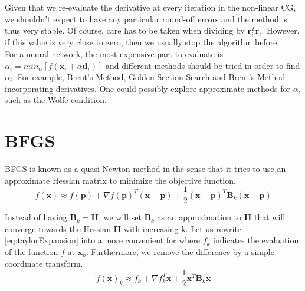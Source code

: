 \documentclass[a4paper,10pt]{article}
\theoremstyle{definition}
\begin{document}
Given that we re-evaluate the derivative at every iteration in the non-linear CG, we shouldn't expect to have any particular round-off errors and the method is thus very stable. Of course, care has to be taken when dividing by $\pmb{r}^T_{i}\pmb{r}_{i}$. However, if this value is very close to zero, then we usually stop the algorithm before. \\

For a neural network, the most expensive part to evaluate is $\alpha_i = min_{\alpha}[f(\pmb{x}_{i} + \alpha \pmb{d}_{i})]$ and different methods should be tried in order to find $\alpha_i$. For example, Brent's Method, Golden Section Search and Brent's Method incorporating derivatives. One could possibly explore approximate methods for $\alpha_i$ such as the Wolfe condition.

\section{BFGS}
BFGS is known as a quasi Newton method in the sense that it tries to use an approximate Hessian matrix to minimize the objective function.
\begin{equation}
	f(\pmb{x}) \approx f(\pmb{p}) + \nabla f(\pmb{p})^T (\pmb{x} - \pmb{p}) + \frac{1}{2}(\pmb{x} - \pmb{p})^T \pmb{B}_k (\pmb{x} - \pmb{p})
	\label{eq:taylorExpansion}
\end{equation}

Instead of having $\pmb{B}_k = \pmb{H}$, we will set $\pmb{B}_k$ as an approximation to $\pmb{H}$ that will converge towards the Hessian $\pmb{H}$ with increasing k. Let us rewrite \ref{eq:taylorExpansion} into a more convenient for where $f_k$ indicates the evaluation of the function $f$ at $\pmb{x}_k$. Furthermore, we remove the difference by a simple coordinate transform.
\begin{equation}
	\tilde{f}(\pmb{x})_{k} \approx f_k + \nabla f_k^T \pmb{x} + \frac{1}{2} \pmb{x}^T \pmb{B}_k \pmb{x}
	\label{eq:taylorSimplified}
\end{equation}
\end{document}
